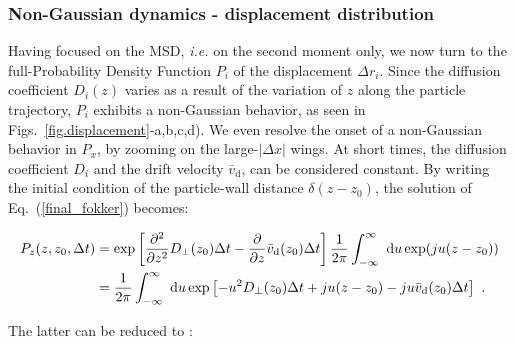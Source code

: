 \subsubsection{Non-Gaussian dynamics - displacement distribution}

Having focused on the \gls{MSD}, \textit{i.e.} on the second moment only, we now turn to the full-Probability Density Function $P_i$ of the displacement $\Delta r_i$. Since the diffusion coefficient $D_i(z)$ varies as a result of the variation of $z$ along the particle trajectory, $P_i$ exhibits a non-Gaussian behavior, as seen in Figs.~\ref{fig.displacement}-a,b,c,d). We even resolve the onset of a non-Gaussian behavior in $P_x$, by zooming on the large-$\lvert\Delta x\rvert$ wings. At short times, the diffusion coefficient $D_i$ and the drift velocity $\bar{v}_\mathrm{d}$, can be considered constant. By writing the initial condition of the particle-wall distance $\delta(z - z_0)$, the solution of Eq.~(\ref{final_fokker}) becomes:

\begin{equation}
	\begin{aligned}
		P_z(z, z_0, \Delta t) &= \exp \left[  \frac{\partial ^2}{\partial z ^2} D_\bot(z_0) \Delta t - \frac{\partial}{\partial z} \bar{v} _\mathrm{d} (z_0) \Delta t \right] \frac{1}{2 \pi} \int _{-\infty} ^{\infty} ~ \textnormal{d}u \exp (ju(z-z_0))  \\
		& = \frac{1}{2\pi} \int_{-\infty}^{\infty} ~ \textnormal{d}u \exp \left[ -u^2 D_\bot(z_0)\Delta t + ju(z-z_0) - ju  \bar{v} _\mathrm{d} (z_0) \Delta t \right] ~.
	\end{aligned}
\end{equation}

The latter can be reduced to \cite{matse_state-dependent_nodate, risken_fokker-planck_2012}:

